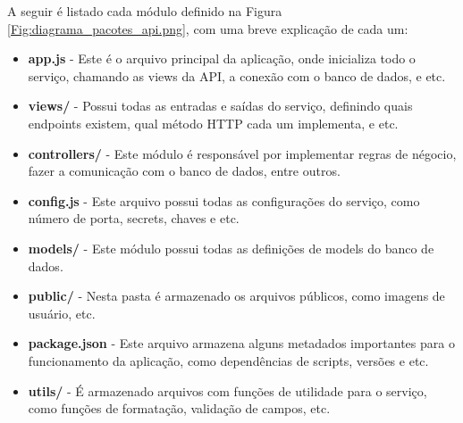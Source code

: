 {A seguir é listado cada módulo definido na Figura \ref{Fig:diagrama_pacotes_api.png}, com uma breve explicação de cada um:

\begin{itemize}
    \item \textbf{app.js} - Este é o arquivo principal da aplicação, onde inicializa todo o serviço, chamando as views da API, a conexão com o banco de dados, e etc.
    \item \textbf{views/} - Possui todas as entradas e saídas do serviço, definindo quais endpoints existem, qual método HTTP cada um implementa, e etc.
    \item \textbf{controllers/} - Este módulo é responsável por implementar regras de négocio, fazer a comunicação com o banco de dados, entre outros.
    \item \textbf{config.js} - Este arquivo possui todas as configurações do serviço, como número de porta, secrets, chaves e etc.
    \item \textbf{models/} - Este módulo possui todas as definições de models do banco de dados.
    \item \textbf{public/} - Nesta pasta é armazenado os arquivos públicos, como imagens de usuário, etc.
    \item \textbf{package.json} - Este arquivo armazena alguns metadados importantes para o funcionamento da aplicação, como dependências de scripts, versões e etc.
    \item \textbf{utils/} - É armazenado arquivos com funções de utilidade para o serviço, como funções de formatação, validação de campos, etc.
\end{itemize}

}


